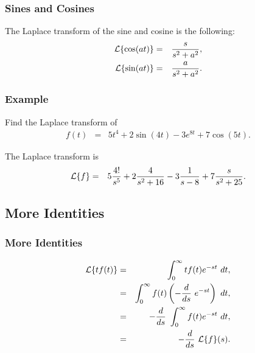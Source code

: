 \begin{frame}
  \frametitle{Sines and Cosines}

  The Laplace transform of the sine and cosine is the following:
  \begin{eqnarray*}
    \laplace{\cos(at)} & = & \frac{s}{s^2+a^2}, \\
    \laplace{\sin(at)} & = & \frac{a}{s^2+a^2}.
  \end{eqnarray*}


\end{frame}


\begin{frame}
  \frametitle{Example}

  Find the Laplace transform of 
  \begin{eqnarray*}
    f(t) & = & 5t^4 + 2\sin(4t) - 3 e^{8t} + 7 \cos(5t).
  \end{eqnarray*}

  The Laplace transform is
  \begin{eqnarray*}
    \laplace{f} & = & 5 \frac{4!}{s^5} + 2 \frac{4}{s^2+16}  - 3\frac{1}{s-8} + 7 \frac{s}{s^2+25}.
  \end{eqnarray*}

\end{frame}

\subsection{More Identities}

\begin{frame}
  \frametitle{More Identities}

  \begin{eqnarray*}
    \laplace{t f(t)} & = & \int^\infty_0 t f(t) e^{-st} ~ dt, \\
    & = & \int^\infty_0 f(t) \lp -\deriv{~}{s} e^{-st} \rp ~ dt, \\
    & = & -\deriv{~}{s} \int^\infty_0 f(t) e^{-st}  ~ dt, \\
    & = & -\deriv{~}{s} \laplace{f}(s).
  \end{eqnarray*}

\end{frame}

